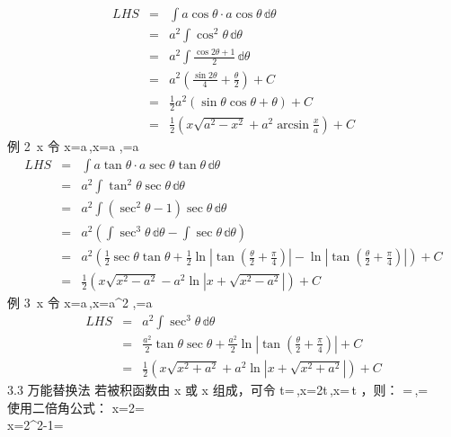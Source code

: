 \begin{eqnarray} LHS&=&\int a\cos\theta\cdot a\cos\theta\,\mathbb{d}\theta\\ &=&a^2\int\cos^2\theta\,\mathbb{d}\theta\\ &=&a^2\int\frac{\cos2\theta+1}{2}\,\mathbb{d}\theta\\ &=&a^2\left(\frac{\sin2\theta}{4}+\frac{\theta}{2}\right)+C\\ &=&\frac{1}{2}a^2\left(\sin\theta\cos\theta+\theta\right)+C\\ &=&\frac{1}{2}\left(x\sqrt{a^2-x^2}+a^2\arcsin\frac{x}{a}\right)+C     \end{eqnarray} 
例 2 \int {}\,x 
令 x=a\sec\theta\,,x=a\sec\theta\tan\theta\,\theta\,,=a\tan\theta 
\begin{eqnarray} LHS&=&\int a\tan\theta\cdot a\sec\theta\tan\theta\,\mathbb{d}\theta\\ &=&a^2\int \tan^2\theta \sec\theta\,\mathbb{d}\theta\\ &=&a^2\int (\sec^2\theta-1)\sec\theta\,\mathbb{d}\theta\\ &=&a^2\left(\int\sec^3\theta\,\mathbb{d}\theta-\int\sec\theta\,\mathbb{d}\theta\right)\\ &=&a^2\left(\frac{1}{2}\sec\theta\tan\theta+\frac{1}2\ln\left|\tan\left(\frac{\theta}{2}+\frac{\pi}{4}\right)\right|-\ln\left|\tan\left(\frac{\theta}{2}+\frac{\pi}{4}\right)\right|\right)+C\\ &=&\frac{1}{2}\left(x\sqrt{x^2-a^2}-a^2\ln|x+\sqrt{x^2-a^2}|\right)+C \end{eqnarray} 
例 3 \int{}\,x 
令 x=a\tan \theta\,,x=a\sec^2\theta\,\theta\,,=a\sec\theta 
\begin{eqnarray} LHS&=&a^2\int \sec^3\theta\,\mathbb{d}\theta\\ &=&\frac{a^2}{2}\tan\theta\sec\theta+\frac{a^2}{2}\ln\left|\tan\left(\frac{\theta}{2}+\frac{\pi}{4}\right)\right|+C\\ &=&\frac{1}{2}\left(x\sqrt{x^2+a^2}+a^2\ln\left|x+\sqrt{x^2+a^2}\right|\right)+C \end{eqnarray} 
3.3 万能替换法
若被积函数由 \sin x 或 \cos x 组成，可令 t=\tan{}\,,x=2\arctan t\,,x=\,t ，则：
\sin{}=\,,\cos {}= \\ 
使用二倍角公式：
\sin x=2\sin{}\cos{}=\\ \cos x=2\cos^2-1= 

